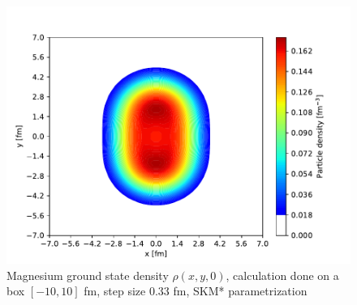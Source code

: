 \begin{figure}[h]
  \centering
  \includegraphics[width=1.0\linewidth]{Images/mg_gs_density_axial.pdf}
  \caption{Magnesium ground state density $\rho(x, y, 0)$, calculation done on a box $[-10, 10]$ fm, step size 0.33 fm, SKM* parametrization}
  \label{fig:mg_gs_density_axial}
\end{figure}

